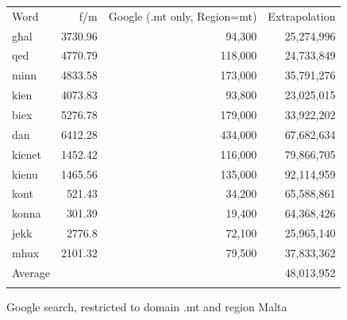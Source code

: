 \begin{multicols}{2}
\begin{figure}[p]
\setlength{\tabcolsep}{2.5em}
\begin{tabularx}{\textwidth}{lrrr} \toprule\addlinespace
Word & f/m & Google (.mt only, Region=mt) &  Extrapolation \\ \addlinespace\midrule\addlinespace
għal & 3730.96 & 94,300 & 25,274,996 \\
qed	& 4770.79 & 118,000 & 24,733,849 \\
minn & 4833.58 & 173,000 & 35,791,276 \\
kien & 4073.83 & 93,800 & 23,025,015 \\
biex & 5276.78 & 179,000 & 33,922,202 \\
dan	& 6412.28 & 434,000 & 67,682,634 \\
kienet & 1452.42 & 116,000 & 79,866,705 \\
kienu & 1465.56 & 135,000 & 92,114,959 \\
kont & 521.43 & 34,200 & 65,588,861 \\
konna & 301.39 & 19,400 & 64,368,426 \\
jekk & 2776.8 & 72,100 & 25,965,140 \\
mhux & 2101.32 & 79,500 & 37,833,362 \\ \addlinespace\midrule\addlinespace
Average& & & 48,013,952 \\ \addlinespace\bottomrule
\end{tabularx}
\caption{Google search, restricted to domain .mt and region Malta}
\label{table:Google_A_en}
\end{figure}


\end{multicols}
